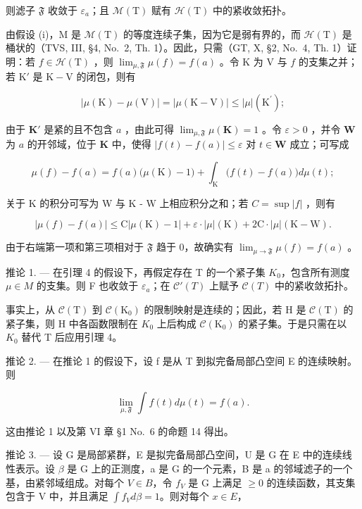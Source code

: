 则滤子 \(\mathfrak{F}\) 收敛于 \(\varepsilon_{a}\)；且 \(\mathcal{M}(\mathrm{T})\) 赋有 \(\mathcal{H}(\mathrm{T})\) 中的紧收敛拓扑。

由假设 (i)，M 是 \(\mathcal{M}(\mathrm{T})\) 的等度连续子集，因为它是弱有界的，而 \(\mathcal{H}(\mathrm{T})\) 是桶状的（TVS, III, §4, No.~2, Th. 1）。因此，只需（GT, X, §2, No.~4, Th. 1）证明：若 \(f \in \mathcal{H}(\mathrm{T})\) ，则 \(\lim_{\mu, \mathfrak{F}} \mu(f) = f(a)\) 。令 K 为 V 与 \(f\) 的支集之并；若 \(\mathrm{K}'\) 是 \(\mathrm{K} - \mathrm{V}\) 的闭包，则有

\[
| \mu (\mathrm{K}) - \mu (\mathrm{V}) | = | \mu (\mathrm{K} - \mathrm{V}) | \leqslant | \mu | (\mathrm{K} ^ {\prime});
\]

由于 \(\mathbf{K}'\) 是紧的且不包含 \(a\) ，由此可得 \(\lim_{\mu, \mathfrak{F}} \mu(\mathbf{K}) = 1\) 。令 \(\varepsilon > 0\) ，并令 \(\mathbf{W}\) 为 \(a\) 的开邻域，位于 \(\mathbf{K}\) 中，使得 \(|f(t) - f(a)| \leqslant \varepsilon\) 对 \(t \in \mathbf{W}\) 成立；可写成

\[
\mu (f) - f (a) = f (a) \big (\mu (\mathrm{K}) - 1 \big) + \int_ {\mathrm{K}} \big (f (t) - f (a) \big) d \mu (t);
\]

关于 K 的积分可写为 W 与 K - W 上相应积分之和；若 \(C = \sup |f|\) ，则有

\[
| \mu (f) - f (a) | \leqslant \mathrm{C} | \mu (\mathrm{K}) - 1 | + \varepsilon \cdot | \mu | (\mathrm{K}) + 2 \mathrm{C} \cdot | \mu | (\mathrm{K} - \mathrm{W}).
\]

由于右端第一项和第三项相对于 \(\mathfrak{F}\) 趋于 0，故确实有 \(\lim_{\mu \to \mathfrak{F}} \mu(f) = f(a)\) 。

推论 1. --- 在引理 4 的假设下，再假定存在 T 的一个紧子集 \(K_{0}\)，包含所有测度 \(\mu \in M\) 的支集。则 F 也收敛于 \(\varepsilon_{a}\)；在 \(\mathcal{C}'(T)\) 上赋予 \(\mathcal{C}(T)\) 中的紧收敛拓扑。

事实上，从 \(\mathcal{C}(\mathrm{T})\) 到 \(\mathcal{C}(\mathrm{K}_{0})\) 的限制映射是连续的；因此，若 H 是 \(\mathcal{C}(\mathrm{T})\) 的紧子集，则 H 中各函数限制在 \(K_{0}\) 上后构成 \(\mathcal{C}(\mathrm{K}_{0})\) 的紧子集。于是只需在以 \(K_{0}\) 替代 T 后应用引理 4。

推论 2. --- 在推论 1 的假设下，设 f 是从 T 到拟完备局部凸空间 E 的连续映射。则

\[
\lim _ {\mu , \mathfrak {F}} \int f (t) d \mu (t) = f (a).
\]

这由推论 1 以及第 VI 章 §1 No.~6 的命题 14 得出。

推论 3. --- 设 G 是局部紧群，E 是拟完备局部凸空间，U 是 G 在 E 中的连续线性表示。设 \(\beta\) 是 G 上的正测度，a 是 G 的一个元素，B 是 a 的邻域滤子的一个基，由紧邻域组成。对每个 \(V \in B\)，令 \(f_{V}\) 是 G 上满足 \(\geqslant 0\) 的连续函数，其支集包含于 V 中，并且满足 \(\int f_{V} d\beta = 1\)。则对每个 \(x \in E\)，

